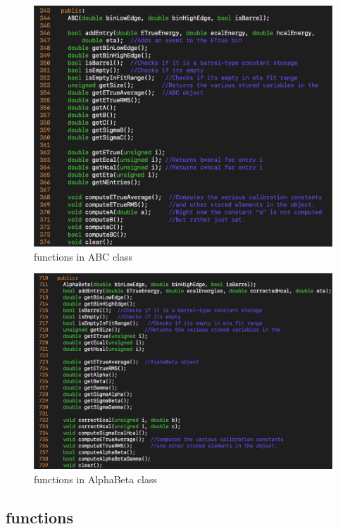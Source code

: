 \documentclass{cernrep}
\begin{document}
\begin{figure}[ht]
\includegraphics[width=1.0\textwidth]{fig/ABC.png}
\caption{functions in ABC class}
\label{ABC}
\end{figure}

\begin{figure}[ht]
\includegraphics[width=1.0\textwidth]{fig/AlphaBeta.png}
\caption{functions in AlphaBeta class}
\label{AlphaBeta}
\end{figure}

\subsection{functions}
\end{document}
